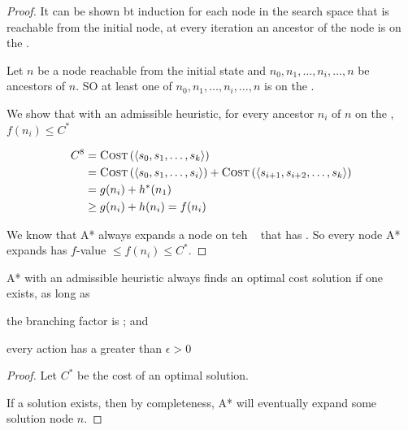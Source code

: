 \begin{listu}
\begin{proof}
        It can be shown bt induction for each node in the search space that is reachable from the initial node, at every iteration an ancestor of the node is on the \Frontier.

        Let $n$ be a node reachable from the initial state and $n_0, n_1, \dots, n_i, \dots, n$ be ancestors of $n$. SO at least one of $n_0, n_1, \dots, n_i, \dots, n$ is  on the \Frontier.

        We show that with an admissible heuristic, for every ancestor $n_i$ of $n$ on the \Frontier, $f(n_i) \le C^*$

        \begin{align*}
            C^8 & = \textsc{Cost} \left( \langle s_0, s_1, \dots, s_k \rangle \right)                                                                             \\
                & = \textsc{Cost} \left( \langle s_0, s_1, \dots, s_i \rangle \right) + \textsc{Cost} \left( \langle s_{i+1}, s_{i+2}, \dots, s_k \rangle \right) \\
                & = g(n_i) + h^*(n_1)                                                                                                                             \\
                & \ge  g(n_i) + h(n_i) = f(n_i)
        \end{align*}

        We know that A* always expands a node on teh \Frontier~ that has . So every node A* expands has $f$-value $\le f(n_i) \le C^*$.
    \end{proof}

    \begin{theorem}\label{thm:optimality-of-astar}
        A* with an admissible heuristic always finds an optimal cost solution if one exists, as long as

        \begin{listu}
            \item the branching factor is ; and
            \item every action has a  greater than $\epsilon > 0$
        \end{listu}
    \end{theorem}

    \begin{proof}
        Let $C^*$ be the cost of an optimal solution.

        If a solution exists, then by completeness, A* will eventually expand some solution node $n$.


\end{proof}
\end{listu}
